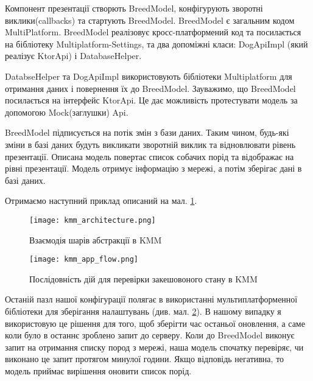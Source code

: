 Компонент презентації створють BreedModel, конфігурують зворотні виклики(callbacks) та стартують BreedModel.
BreedModel є загальним кодом MultiPlatform.
BreedModel реалізовує кросс-платформений код та посилається на бібліотеку Multiplatform-Settings,
та два допоміжні класи: DogApiImpl (який реалізує KtorApi) і DatabaseHelper.

DatabseHelper та DogApiImpl використовують бібліотеки Multiplatform для отримання даних і повернення їх до BreedModel.
Зауважимо, що BreedModel посилається на інтерфейс KtorApi. Це дає можливість протестувати модель за допомогою Mock(заглушки) Api.

BreedModel підписується на потік змін з бази даних. Таким чином, будь-які зміни в базі даних будуть викликати
зворотній виклик та відновлювати рівень презентації.
Описана модель повертає список собачих порід та відображає на рівні презентації.
Модель отримує інформацію з мережі, а потім зберігає дані в базі даних.

Отримаємо наступний приклад описаний на мал. \ref{fig:kmm_architecture}.

\begin{figure}
    \begin{center}
        \texttt{[image: kmm\_architecture.png]}
        \caption{Взаємодія шарів абстракції в KMM}
        \label{fig:kmm_architecture}
    \end{center}
\end{figure}

\begin{figure}
    \begin{center}
        \texttt{[image: kmm\_app\_flow.png]}
        \caption{Послідовність дій для перевірки закешовоного стану в KMM}
        \label{fig:kmm_app_flow}
    \end{center}
\end{figure}

Останій пазл нашої конфігурації полягає в використанні мультиплатформенної бібліотеки для зберігання налаштувань (див. мал. \ref{fig:kmm_app_flow}).
В нашому випадку я використовую це рішення для того, щоб зберігти час останьої оновлення, а саме коли було в останнє зроблено запит до серверу.
Коли до BreedModel виконує запит на отримання списку пород з мережі, наша модель спочатку перевіряє, чи виконано це запит протягом минулої години.
Якщо відповідь негативна, то модель приймає вирішення оновити список порід.


